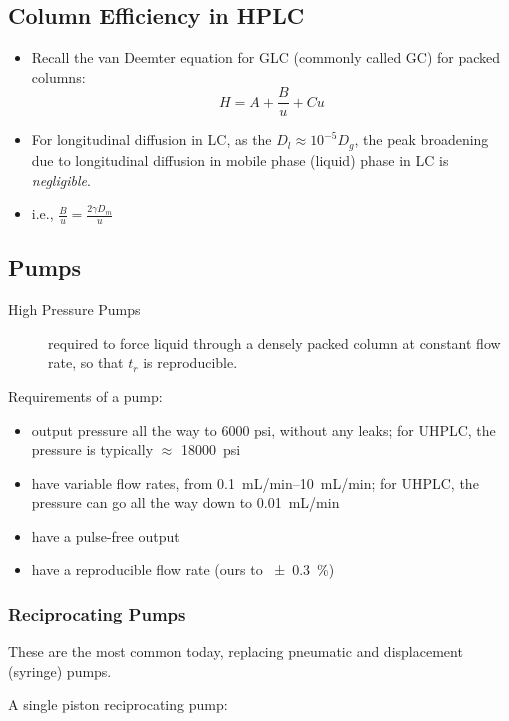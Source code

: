 \documentclass[a4paper, 12pt]{article}
\begin{document}
\subsection{Column Efficiency in HPLC}
\begin{itemize}
	\item Recall the van Deemter equation for GLC (commonly called GC) for packed columns:
	\begin{equation}
		H = A + \frac{B}{u} + Cu
	\end{equation}
	\item For longitudinal diffusion in LC, as the $D_l \approx 10^{-5}D_g$, the peak broadening due to longitudinal diffusion in mobile phase (liquid) phase in LC is \textit{negligible}.
	\item i.e., $\frac{B}{u} = \frac{2\gamma{}D_m}{u}$
\end{itemize}


\subsection{Pumps}

\begin{description}
	\item[High Pressure Pumps] required to force liquid through a densely packed column at constant flow rate, so that $t_r$ is reproducible.
\end{description} 

Requirements of a pump:

\begin{itemize}
	\item output pressure all the way to 6000 psi, without any leaks; for UHPLC, the pressure is typically $\approx$ \SI{18000}{psi}
	\item have variable flow rates, from \SIrange{0.1}{10}{mL/min}; for UHPLC, the pressure can go all the way down to \SI{0.01}{mL/min}
	\item have a pulse-free output
	\item have a reproducible flow rate (ours to \SI{+-0.3}{\%})
\end{itemize}

\subsubsection{Reciprocating Pumps}
These are the most common today, replacing pneumatic and displacement (syringe) pumps.

A single piston reciprocating pump:
\end{document}
